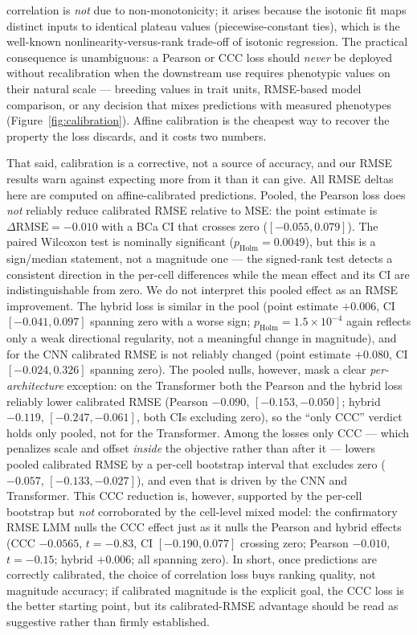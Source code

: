 correlation is \emph{not} due to non-monotonicity; it arises because the isotonic
fit maps distinct inputs to identical plateau values (piecewise-constant ties),
which is the well-known nonlinearity-versus-rank trade-off of isotonic
regression. The practical consequence is unambiguous: a Pearson or CCC loss should
\emph{never} be deployed without recalibration when the downstream use requires
phenotypic values on their natural scale --- breeding values in trait units,
RMSE-based model comparison, or any decision that mixes predictions with measured
phenotypes (Figure~\ref{fig:calibration}). Affine calibration is the cheapest way
to recover the property the loss discards, and it costs two numbers.

That said, calibration is a corrective, not a source of accuracy, and our RMSE
results warn against expecting more from it than it can give. All RMSE deltas here
are computed on affine-calibrated predictions. Pooled, the Pearson loss does
\emph{not} reliably reduce calibrated RMSE relative to MSE: the point estimate is
$\Delta\mathrm{RMSE}=-0.010$ with a BCa CI that crosses zero ($[-0.055,0.079]$).
The paired Wilcoxon test is nominally significant ($p_{\mathrm{Holm}}=0.0049$), but
this is a sign/median statement, not a magnitude one --- the signed-rank test
detects a consistent direction in the per-cell differences while the mean effect
and its CI are indistinguishable from zero. We do not interpret this pooled effect as an RMSE
improvement. The hybrid loss is similar in the pool (point estimate $+0.006$, CI
$[-0.041,0.097]$ spanning zero with a worse sign; $p_{\mathrm{Holm}}=1.5\times
10^{-4}$ again reflects only a weak directional regularity, not a meaningful change
in magnitude), and for the CNN calibrated RMSE is not reliably changed (point
estimate $+0.080$, CI $[-0.024,0.326]$ spanning zero). The pooled nulls,
however, mask a clear \emph{per-architecture} exception: on the Transformer both
the Pearson and the hybrid loss reliably lower calibrated RMSE (Pearson $-0.090$,
$[-0.153,-0.050]$; hybrid $-0.119$, $[-0.247,-0.061]$, both CIs excluding zero), so
the ``only CCC'' verdict holds only pooled, not for the Transformer. Among the
losses only CCC --- which penalizes scale and offset \emph{inside} the objective
rather than after it --- lowers pooled calibrated RMSE by a per-cell bootstrap
interval that excludes zero ($-0.057$, $[-0.133,-0.027]$), and even that is driven
by the CNN and Transformer. This CCC reduction is, however, supported by the
per-cell bootstrap but \emph{not} corroborated by the cell-level mixed model: the
confirmatory RMSE LMM nulls the CCC effect just as it nulls the Pearson and hybrid
effects (CCC $-0.0565$, $t=-0.83$, CI $[-0.190,0.077]$ crossing zero; Pearson
$-0.010$, $t=-0.15$; hybrid $+0.006$; all spanning zero). In short, once
predictions are correctly calibrated, the choice of correlation loss buys ranking
quality, not magnitude accuracy; if calibrated magnitude is the explicit goal, the
CCC loss is the better starting point, but its calibrated-RMSE advantage should be
read as suggestive rather than firmly established.

